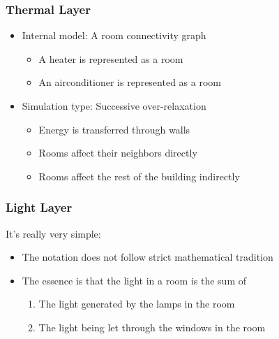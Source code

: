 \documentclass[t]{beamer}
\begin{document}
\begin{frame}
  \frametitle{Thermal Layer}
  
  \begin{itemize}
    \item Internal model: A room connectivity graph
      \begin{itemize}
        \item A heater is represented as a room
        \item An airconditioner is represented as a room
      \end{itemize}
    \item Simulation type: Successive over-relaxation
      \begin{itemize}
        \item Energy is transferred through walls
        \item Rooms affect their neighbors directly
        \item Rooms affect the rest of the building indirectly
      \end{itemize}
  \end{itemize}
  
\end{frame}

\begin{frame}
  \frametitle{Light Layer}
  
  It's really very simple:
  \begin{center}
  \end{center}
  
  \begin{itemize}
    \item The notation does not follow strict mathematical tradition
    \item The essence is that the light in a room is the sum of
    \begin{enumerate}
      \item The light generated by the lamps in the room
      \item The light being let through the windows in the room
    \end{enumerate}
  \end{itemize}
  
\end{frame}
\end{document}
